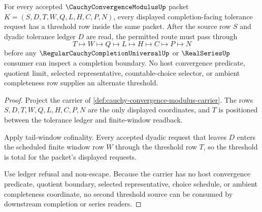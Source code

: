 \begin{theorem}
\label{thm:cauchy-convergence-modulus-threshold-totality}
For every accepted $\CauchyConvergenceModulusUp$ packet $K=(S,D,T,W,Q,L,H,C,P,N)$, every displayed completion-facing tolerance request has a threshold row inside the same packet. After the source row $S$ and dyadic tolerance ledger $D$ are read, the permitted route must pass through
$$
T\longmapsto W\longmapsto Q\longmapsto L\longmapsto H\longmapsto C\longmapsto P\longmapsto N
$$
before any $\RegularCauchyCompletionUniversalUp$ or $\RealSeriesUp$ consumer can inspect a completion boundary. No host convergence predicate, quotient limit, selected representative, countable-choice selector, or ambient completeness row supplies an alternate threshold.
\end{theorem}
\begin{proof}
Project the carrier of \autoref{def:cauchy-convergence-modulus-carrier}. The rows $S,D,T,W,Q,L,H,C,P,N$ are the only displayed coordinates, and $T$ is positioned between the tolerance ledger and finite-window readback.

Apply tail-window cofinality. Every accepted dyadic request that leaves $D$ enters the scheduled finite window row $W$ through the threshold row $T$, so the threshold is total for the packet's displayed requests.

Use ledger refusal and non-escape. Because the carrier has no host convergence predicate, quotient boundary, selected representative, choice schedule, or ambient completeness coordinate, no second threshold source can be consumed by downstream completion or series readers.
\end{proof}

